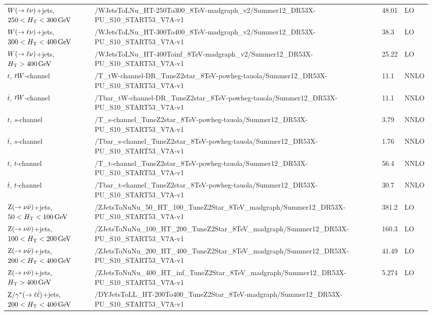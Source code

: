 \begin{table}
\begin{center}
\begin{tabular}{l l l l}
\midrule
$W(\rightarrow\ell\nu)$+jets, $250 < H_{\mathrm{T}}< 300\,\text{Ge\hspace{-.08em}V}$ & 
/WJetsToLNu\_HT-250To300\_8TeV-madgraph\_v2/Summer12\_DR53X-PU\_S10\_START53\_V7A-v1 & 48.01
& LO \\
$W(\rightarrow\ell\nu)$+jets, $300 < H_{\mathrm{T}}< 400\,\text{Ge\hspace{-.08em}V}$ &
/WJetsToLNu\_HT-300To400\_8TeV-madgraph\_v2/Summer12\_DR53X-PU\_S10\_START53\_V7A-v1 & 38.3 &
LO \\
$W(\rightarrow\ell\nu)$+jets, $H_{\mathrm{T}} > 400\,\text{Ge\hspace{-.08em}V}$ &
/WJetsToLNu\_HT-400Toinf\_8TeV-madgraph\_v2/Summer12\_DR53X-PU\_S10\_START53\_V7A-v1 & 25.22
& LO \\
\midrule
$t$, $tW$-channel &
/T\_tW-channel-DR\_TuneZ2star\_8TeV-powheg-tauola/Summer12\_DR53X-PU\_S10\_START53\_V7A-v1 &
11.1 & NNLO \\
$\bar{t}$, $tW$-channel &
/Tbar\_tW-channel-DR\_TuneZ2star\_8TeV-powheg-tauola/Summer12\_DR53X-PU\_S10\_START53\_V7A-v1
& 11.1 & NNLO \\
$t$, $s$-channel &
/T\_s-channel\_TuneZ2star\_8TeV-powheg-tauola/Summer12\_DR53X-PU\_S10\_START53\_V7A-v1 & 3.79
& NNLO \\
$\bar{t}$, $s$-channel &
/Tbar\_s-channel\_TuneZ2star\_8TeV-powheg-tauola/Summer12\_DR53X-PU\_S10\_START53\_V7A-v1 &
1.76 & NNLO \\
$t$, $t$-channel &
/T\_t-channel\_TuneZ2star\_8TeV-powheg-tauola/Summer12\_DR53X-PU\_S10\_START53\_V7A-v1 & 56.4
& NNLO \\
$\bar{t}$, $t$-channel &
/Tbar\_t-channel\_TuneZ2star\_8TeV-powheg-tauola/Summer12\_DR53X-PU\_S10\_START53\_V7A-v1 &
30.7 & NNLO \\
\midrule
$\mathrm{Z} (\rightarrow \nu \bar{\nu})$+jets, $50 < H_{\mathrm{T}} < 100\,\text{Ge\hspace{-.08em}V}$ & 
/ZJetsToNuNu\_50\_HT\_100\_TuneZ2Star\_8TeV\_madgraph/Summer12\_DR53X-PU\_S10\_START53\_V7A-v1 
& 381.2 & LO \\
$\mathrm{Z} (\rightarrow \nu \bar{\nu})$+jets, $100 < H_{\mathrm{T}} < 200\,\text{Ge\hspace{-.08em}V}$ &
/ZJetsToNuNu\_100\_HT\_200\_TuneZ2Star\_8TeV\_madgraph/Summer12\_DR53X-PU\_S10\_START53\_V7A-v1 
& 160.3 & LO \\
$\mathrm{Z} (\rightarrow \nu \bar{\nu})$+jets, $200 < H_{\mathrm{T}} < 400\,\text{Ge\hspace{-.08em}V}$ &
/ZJetsToNuNu\_200\_HT\_400\_TuneZ2Star\_8TeV\_madgraph/Summer12\_DR53X-PU\_S10\_START53\_V7A-v1 
& 41.49 & LO \\
$\mathrm{Z} (\rightarrow \nu \bar{\nu})$+jets, $H_{\mathrm{T}} > 400\,\text{Ge\hspace{-.08em}V}$ &
/ZJetsToNuNu\_400\_HT\_inf\_TuneZ2Star\_8TeV\_madgraph/Summer12\_DR53X-PU\_S10\_START53\_V7A-v1 
& 5.274 & LO \\
\midrule
$\mathrm{Z}/\gamma^* (\rightarrow \ell \bar{\ell})$+jets, $200 < H_{\mathrm{T}} < 400\,\text{Ge\hspace{-.08em}V}$ &
/DYJetsToLL\_HT-200To400\_TuneZ2Star\_8TeV-madgraph/Summer12\_DR53X-PU\_S10\_START53\_V7A-v1

\end{tabular}
\end{center}
\end{table}
